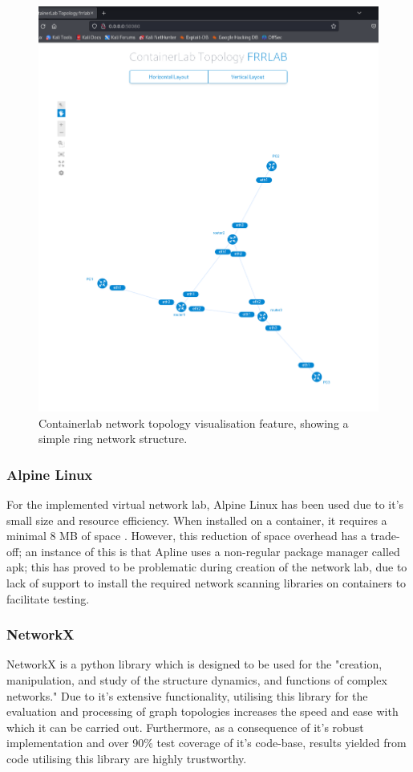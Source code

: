\begin{figure}
    \centering
    \includegraphics[width=0.5\linewidth]{images/ring_containerlab.png}
    \caption{Containerlab network topology visualisation feature, showing a simple ring network structure.}
    \label{fig:ring_container}
\end{figure}

\subsubsection{Alpine Linux}
For the implemented virtual network lab, Alpine Linux has been used due to it's small size and resource efficiency. When installed on a container, it  requires a minimal 8 MB of space \cite{alpine}. However, this reduction of space overhead has a trade-off; an instance of this is that Apline uses a non-regular package manager called apk; this has proved to be problematic during creation of the network lab, due to lack of support to install the required network scanning libraries on containers to facilitate testing. 

\subsubsection{NetworkX}
NetworkX is a python library which is designed to be used for the "creation, manipulation, and study of the structure dynamics, and functions of complex networks." \cite{networkX} Due to it's extensive functionality, utilising this library for the evaluation and processing of graph topologies increases the speed and ease with which it can be carried out. Furthermore, as a consequence of it's robust implementation and over 90\% test coverage of it's code-base, results yielded from code utilising this library are highly trustworthy. 

